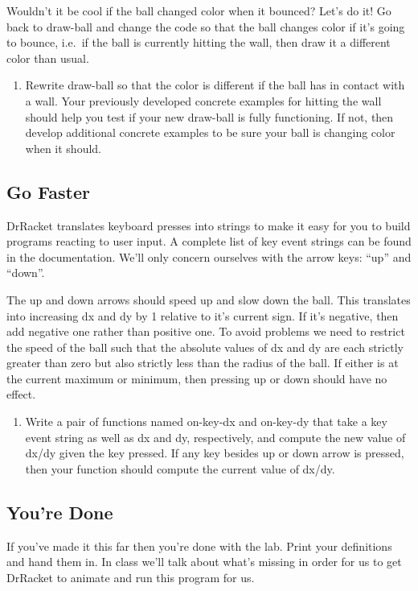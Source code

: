 \documentclass[nobib]{tufte-handout}
\begin{document}
Wouldn't it be cool if the ball changed color when it bounced? Let's do it! Go back to draw-ball and change the code so that the ball changes color if it's going to bounce, i.e.\ if the ball is currently hitting the wall, then draw it a different color than usual.

\begin{enumerate}[resume]
  \item Rewrite draw-ball so that the color is different if the ball has in contact with a wall. Your previously developed concrete examples for hitting the wall should help you test if your new draw-ball is fully functioning.  If not, then develop additional concrete examples to be sure your ball is changing color when it should.
\end{enumerate}

\subsection*{Go Faster}

DrRacket translates keyboard presses into strings to make it easy for you to build programs reacting to user input. A complete list of key event strings can be found in the documentation. We'll only concern ourselves with the arrow keys: ``up'' and ``down''.

The up and down arrows should speed up and slow down the ball. This translates into increasing dx and dy by 1 relative to it's current sign. If it's negative, then add negative one rather than positive one. To avoid problems we need to restrict the speed of the ball such that the absolute values of dx and dy are each strictly greater than zero but also strictly less than the radius of the ball. If either is at the current maximum or minimum, then pressing up or down should have no effect.

\begin{enumerate}[resume]
  \item Write a pair of functions named on-key-dx and on-key-dy that take a key event string as well as dx and dy, respectively, and compute the new value of dx/dy given the key pressed. If any key besides up or down arrow is pressed, then your function should compute the current value of dx/dy.
\end{enumerate}

\subsection*{You're Done}

If you've made it this far then you're done with the lab. Print your definitions and hand them in. In class we'll talk about what's missing in order for us to get DrRacket to animate and run this program for us.
\end{document}

